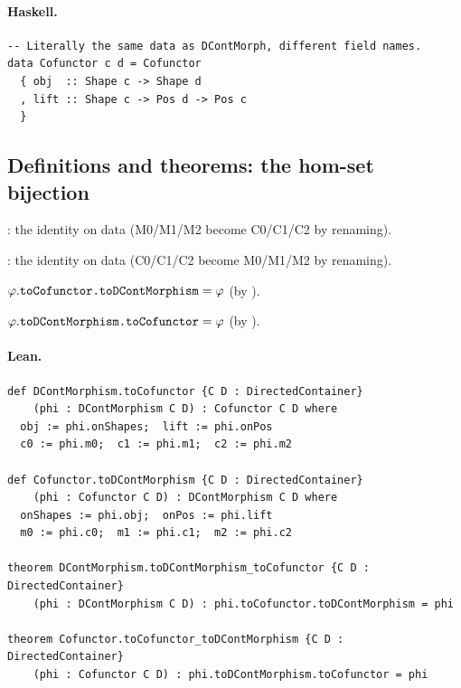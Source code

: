 \documentclass[11pt,a4paper]{article}
\begin{document}
\paragraph{Haskell.}
\begin{lstlisting}[style=haskell]
-- Literally the same data as DContMorph, different field names.
data Cofunctor c d = Cofunctor
  { obj  :: Shape c -> Shape d
  , lift :: Shape c -> Pos d -> Pos c
  }
\end{lstlisting}


\subsection{Definitions and theorems: the hom-set bijection}

\begin{defn}
: the identity on data (M0/M1/M2 become
C0/C1/C2 by renaming).
\end{defn}

\begin{defn}
: the identity on data (C0/C1/C2 become
M0/M1/M2 by renaming).
\end{defn}

\begin{thm}
$\varphi.\texttt{toCofunctor.toDContMorphism} = \varphi$ (by ).
\end{thm}

\begin{thm}
$\varphi.\texttt{toDContMorphism.toCofunctor} = \varphi$ (by ).
\end{thm}

\paragraph{Lean.}
\begin{lstlisting}[style=lean]
def DContMorphism.toCofunctor {C D : DirectedContainer}
    (phi : DContMorphism C D) : Cofunctor C D where
  obj := phi.onShapes;  lift := phi.onPos
  c0 := phi.m0;  c1 := phi.m1;  c2 := phi.m2

def Cofunctor.toDContMorphism {C D : DirectedContainer}
    (phi : Cofunctor C D) : DContMorphism C D where
  onShapes := phi.obj;  onPos := phi.lift
  m0 := phi.c0;  m1 := phi.c1;  m2 := phi.c2

theorem DContMorphism.toDContMorphism_toCofunctor {C D : DirectedContainer}
    (phi : DContMorphism C D) : phi.toCofunctor.toDContMorphism = phi

theorem Cofunctor.toCofunctor_toDContMorphism {C D : DirectedContainer}
    (phi : Cofunctor C D) : phi.toDContMorphism.toCofunctor = phi
\end{lstlisting}
\end{document}
